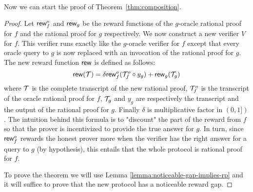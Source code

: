 Now we can start the proof of Theorem~\ref{thm:composition}.
\begin{proof}

Let $\mathsf{rew}^o_f$ and $\mathsf{rew}_g$ be the reward functions of the $g$-oracle rational proof for $f$ and the rational proof for $g$ respectively.
We now construct a new verifier $V$ for $f$. This verifier runs exactly like the $g$-oracle verifier for $f$ except that every oracle query to $g$ is now replaced with an invocation of the rational proof for $g$.
The new reward function $\mathsf{rew}$ is defined as follows:
$$ \mathsf{rew}(\mathcal{T}) = \delta \mathsf{rew}^o_f(\mathcal{T}^o_f \circ y_g)  + \mathsf{rew}_g(\mathcal{T}_g)$$
where $\mathcal{T}$ is the complete transcript of the new rational proof, $\mathcal{T}^o_f$ is the transcript of the oracle rational proof for $f$,  $\mathcal{T}_g$ and $y_g$ are respectively the transcript and  the output of the rational proof for $g$. Finally $\delta$ is multiplicative factor in $(0,1])$. The intuition behind this formula is to "discount" the part of the reward from $f$ so that the prover is incentivized to provide the true answer for $g$. In turn, since $\mathsf{rew}^o_f$ rewards the honest prover more when  the verifier has the right answer for a query to $g$ (by hypothesis), this entails that the whole protocol is rational proof for $f$.

To prove the theorem we will use Lemma \ref{lemma:noticeable-gap-implies-rp} and it will suffice to prove that the new protocol has a noticeable reward gap.
\newcommand{\pg}{p_{g}}
\newcommand{\Rf}{R_f^o}
\newcommand{\disRf}{\tilde{R}_f^o}
\newcommand{\disRfGoodg}{\tilde{R}_f^{o,\text{good}(g)}}
\newcommand{\disRfWrongg}{\tilde{R}_f^{o,\text{wrong}(g)}}
\newcommand{\disRgGoodg}{\tilde{R}_g^{\text{good}(g)}}
\newcommand{\disRgWrongg}{\tilde{R}_g^{\text{wrong}(g)}}
\newcommand{\Rfmax}{b^o_f(n)}



\end{proof}
